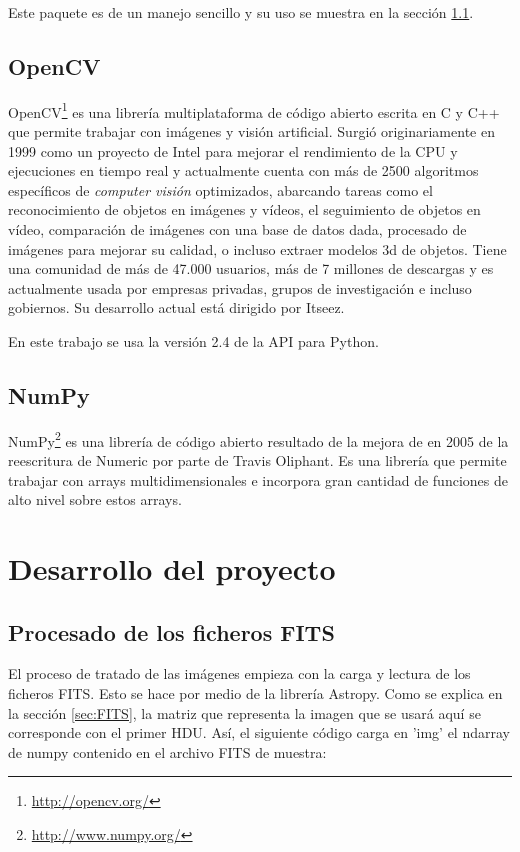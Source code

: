 \documentclass[a4paper,12pt]{article}
\begin{document}
Este paquete es de un manejo sencillo y su uso se muestra en la sección \ref{sec:Procesado}.
\subsection{OpenCV}
OpenCV\footnote{\url{http://opencv.org/}} es una librería multiplataforma de código abierto escrita en C y C++ que permite trabajar con imágenes y visión artificial. Surgió originariamente en 1999 como un proyecto de Intel para mejorar el rendimiento de la CPU y ejecuciones en tiempo real y actualmente cuenta con más de 2500 algoritmos específicos de \textit{computer visión} optimizados, abarcando tareas como el reconocimiento de objetos en imágenes y vídeos, el seguimiento de objetos en vídeo, comparación de imágenes con una base de datos dada, procesado de imágenes para mejorar su calidad, o incluso extraer modelos 3d de objetos. Tiene una comunidad de más de 47.000 usuarios, más de 7 millones de descargas y es actualmente usada por empresas privadas, grupos de investigación e incluso gobiernos. Su desarrollo actual está dirigido por Itseez.

En este trabajo se usa la versión 2.4 de la API para Python.
\subsection{NumPy}
NumPy\footnote{\url{http://www.numpy.org/}} es una librería de código abierto resultado de la mejora de en 2005 de la reescritura de Numeric por parte de Travis Oliphant. Es una librería que permite trabajar con arrays multidimensionales e incorpora gran cantidad de funciones de alto nivel sobre estos arrays.
\section{Desarrollo del proyecto}
\subsection{Procesado de los ficheros FITS}
\label{sec:Procesado}
El proceso de tratado de las imágenes empieza con la carga y lectura de los ficheros FITS. Esto se hace por medio de la librería Astropy. Como se explica en la sección \ref{sec:FITS}, la matriz que representa la imagen que se usará aquí se corresponde con el primer HDU. Así, el siguiente código carga en 'img' el ndarray de numpy contenido en el archivo FITS de muestra:


\end{document}
